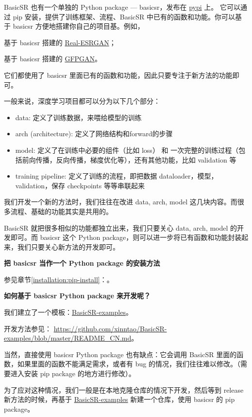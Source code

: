 \documentclass[../main.tex]{subfiles}
\begin{document}
BasicSR 也有一个单独的 Python package --- basicsr，发布在 \href{https://pypi.org/project/basicsr}{pypi} 上。
它可以通过 pip 安装，提供了训练框架、流程、BasicSR 中已有的函数和功能。你可以基于 basicsr 方便地搭建你自己的项目基。例如，

\centerline{基于 basicsr 搭建的 \href{https://github.com/xinntao/Real-ESRGAN}{Real-ESRGAN}；}
\centerline{基于 basicsr 搭建的 \href{https://github.com/TencentARC/GFPGAN}{GFPGAN}。}

它们都使用了 basicsr 里面已有的函数和功能，因此只要专注于新方法的功能即可。

一般来说，深度学习项目都可以分为以下几个部分：
\begin{itemize}
    \item data: 定义了训练数据，来喂给模型的训练
    \item arch (architecture): 定义了网络结构和forward的步骤
    \item model: 定义了在训练中必要的组件（比如 loss） 和 一次完整的训练过程（包括前向传播，反向传播，梯度优化等），还有其他功能，比如 validation 等
    \item training pipeline: 定义了训练的流程，即把数据 dataloader，模型，validation，保存 checkpoints 等等串联起来
\end{itemize}

我们开发一个新的方法时，我们往往在改进 data, arch, model 这几块内容。而很多流程、基础的功能其实是共用的。

BasicSR 就把很多相似的功能都独立出来，我们只要关心 data, arch, model 的开发即可。而 basicsr 这个 Python package，则可以进一步将已有函数和功能封装起来，我们只要关心新方法的开发即可。


\begin{note} %
    \textbf{把 basicsr 当作一个 Python package 的安装方法}

    参见章节\ref{installation:pip-install}：。
\end{note}

\textbf{}

\begin{note} %
    \textbf{如何基于 basicsr Python package 来开发呢？}

    我们建立了一个模板：\href{https://github.com/xinntao/BasicSR-examples}{BasicSR-examples}。

    开发方法参见： \url{https://github.com/xinntao/BasicSR-examples/blob/master/README_CN.md}。
\end{note}

当然，直接使用 basicsr Python package 也有缺点：它会调用 BasicSR 里面的函数，如果里面的函数不能满足需求，或者有 bug 的情况，我们往往难以修改。（需要进入安装 pip package 的地方进行修改）。

为了应对这种情况，我们一般是在本地克隆仓库的情况下开发，然后等到 release 新方法的时候，再基于 \href{https://github.com/xinntao/BasicSR-examples}{BasicSR-examples} 新建一个仓库，使用 basicsr 的 pip package。
\end{document}
